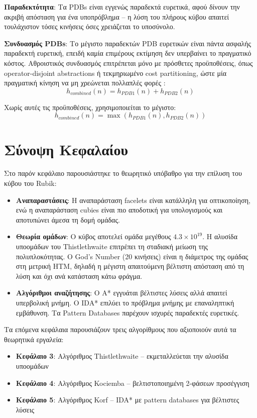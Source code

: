 \textbf{Παραδεκτότητα}: Τα PDBs είναι εγγενώς παραδεκτά ευρετικά, αφού δίνουν την ακριβή απόσταση για ένα υποπρόβλημα -- η λύση του πλήρους κύβου απαιτεί τουλάχιστον τόσες κινήσεις όσες χρειάζεται το υποσύνολο.

\textbf{Συνδυασμός PDBs}: Το μέγιστο παραδεκτών PDB ευρετικών είναι πάντα ασφαλής παραδεκτή ευρετική, επειδή καμία επιμέρους εκτίμηση δεν υπερβαίνει το πραγματικό κόστος. Αθροιστικός συνδυασμός επιτρέπεται μόνο με πρόσθετες προϋποθέσεις, όπως operator-disjoint abstractions ή τεκμηριωμένο cost partitioning, ώστε μία πραγματική κίνηση να μη χρεώνεται πολλαπλές φορές \cite{korf2002disjoint}:
\begin{equation}
    h_{combined}(n) = h_{PDB1}(n) + h_{PDB2}(n)
\end{equation}

Χωρίς αυτές τις προϋποθέσεις, χρησιμοποιείται το μέγιστο:
\begin{equation}
    h_{combined}(n) = \max(h_{PDB1}(n), h_{PDB2}(n))
\end{equation}


\section{Σύνοψη Κεφαλαίου}
\label{sec:bg_summary}

Στο παρόν κεφάλαιο παρουσιάστηκε το θεωρητικό υπόβαθρο για την επίλυση του κύβου του Rubik:

\begin{itemize}
    \item \textbf{Αναπαραστάσεις}: Η αναπαράσταση facelets είναι κατάλληλη για οπτικοποίηση, ενώ η αναπαράσταση cubies είναι πιο αποδοτική για υπολογισμούς και αποτυπώνει άμεσα τη δομή ομάδας.

    \item \textbf{Θεωρία ομάδων}: Ο κύβος αποτελεί ομάδα μεγέθους $4.3 \times 10^{19}$. Η αλυσίδα υποομάδων του Thistlethwaite επιτρέπει τη σταδιακή μείωση της πολυπλοκότητας. Ο God's Number (20 κινήσεις) είναι η διάμετρος της ομάδας στη μετρική HTM, δηλαδή η μέγιστη απαιτούμενη βέλτιστη απόσταση από τη λύση και όχι ανά κατάσταση κάτω φράγμα.

    \item \textbf{Αλγόριθμοι αναζήτησης}: Ο A* εγγυάται βέλτιστες λύσεις αλλά απαιτεί υπερβολική μνήμη. Ο IDA* επιλύει το πρόβλημα μνήμης με επαναληπτική εμβάθυνση. Τα Pattern Databases παρέχουν ισχυρές παραδεκτές ευρετικές.
\end{itemize}

Τα επόμενα κεφάλαια παρουσιάζουν τρεις αλγορίθμους που αξιοποιούν αυτά τα θεωρητικά εργαλεία:
\begin{itemize}
    \item \textbf{Κεφάλαιο 3}: Αλγόριθμος Thistlethwaite -- εκμεταλλεύεται την αλυσίδα υποομάδων
    \item \textbf{Κεφάλαιο 4}: Αλγόριθμος Kociemba -- βελτιστοποιημένη 2-φάσεων προσέγγιση
    \item \textbf{Κεφάλαιο 5}: Αλγόριθμος Korf -- IDA* με pattern databases για βέλτιστες λύσεις
\end{itemize}
